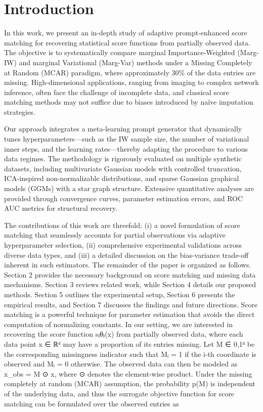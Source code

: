\documentclass{article}
\begin{document}
\section{Introduction}
In this work, we present an in-depth study of adaptive prompt-enhanced score matching for recovering statistical score functions from partially observed data. The objective is to systematically compare marginal Importance-Weighted (Marg-IW) and marginal Variational (Marg-Var) methods under a Missing Completely at Random (MCAR) paradigm, where approximately 30\% of the data entries are missing. High-dimensional applications, ranging from imaging to complex network inference, often face the challenge of incomplete data, and classical score matching methods may not suffice due to biases introduced by naïve imputation strategies.

Our approach integrates a meta-learning prompt generator that dynamically tunes hyperparameters—such as the IW sample size, the number of variational inner steps, and the learning rates—thereby adapting the procedure to various data regimes. The methodology is rigorously evaluated on multiple synthetic datasets, including multivariate Gaussian models with controlled truncation, ICA-inspired non-normalizable distributions, and sparse Gaussian graphical models (GGMs) with a star graph structure. Extensive quantitative analyses are provided through convergence curves, parameter estimation errors, and ROC AUC metrics for structural recovery.

The contributions of this work are threefold: (i) a novel formulation of score matching that seamlessly accounts for partial observations via adaptive hyperparameter selection, (ii) comprehensive experimental validations across diverse data types, and (iii) a detailed discussion on the bias-variance trade-off inherent in such estimators. The remainder of the paper is organized as follows. Section 2 provides the necessary background on score matching and missing data mechanisms. Section 3 reviews related work, while Section 4 details our proposed methods. Section 5 outlines the experimental setup, Section 6 presents the empirical results, and Section 7 discusses the findings and future directions.
Score matching is a powerful technique for parameter estimation that avoids the direct computation of normalizing constants. In our setting, we are interested in recovering the score function s₍θ₎(x) from partially observed data, where each data point x ∈ ℝᵈ may have a proportion of its entries missing. Let M ∈ {0,1}ᵈ be the corresponding missingness indicator such that Mᵢ = 1 if the i-th coordinate is observed and Mᵢ = 0 otherwise. The observed data can then be modeled as x_obs = M ⊙ x, where ⊙ denotes the element-wise product. Under the missing completely at random (MCAR) assumption, the probability p(M) is independent of the underlying data, and thus the surrogate objective function for score matching can be formulated over the observed entries as
\end{document}
